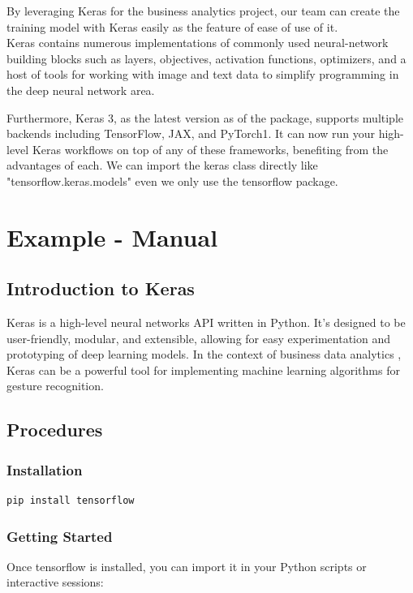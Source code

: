 By leveraging Keras for the business analytics project, our team can create the training model with Keras easily as the feature of ease of use of it.\\Keras contains numerous implementations of commonly used neural-network building blocks such as layers, objectives, activation functions, optimizers, and a host of tools for working with image and text data to simplify programming in the deep neural network area.

Furthermore, Keras 3, as the latest version as of the package, supports multiple backends including TensorFlow, JAX, and PyTorch1. It can now run your high-level Keras workflows on top of any of these frameworks, benefiting from the advantages of each. We can import the keras class directly like "tensorflow.keras.models" even we only use the tensorflow package. 

	\section{Example - Manual}

	\subsection{Introduction to Keras}
	Keras is a high-level neural networks API written in Python. It's designed to be user-friendly, modular, and extensible, allowing for easy experimentation and prototyping of deep learning models. In the context of business data analytics , Keras can be a powerful tool for implementing machine learning algorithms for gesture recognition.\cite{Keras:2023}

	\subsection{Procedures}
	\subsubsection{Installation}
	
	
	\begin{lstlisting}[language=bash]
pip install tensorflow	
	\end{lstlisting}

	\subsubsection{Getting Started}
	Once tensorflow is installed, you can import it in your Python scripts or interactive sessions:
	
